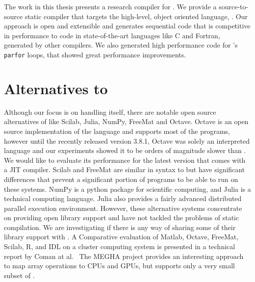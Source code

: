The work in this thesis presents a research compiler for \matlab. 
We provide a source-to-source static
compiler that targets the high-level, object oriented language, \xten.  Our approach is
open and extensible and generates sequential \xten code that is competitive in
performance to code in state-of-the-art languages like C and Fortran, generated
by other \matlab compilers. We also generated high performance code for
\matlab's \texttt{parfor} loops, that showed great performance improvements.

\section{Alternatives to \matlab}
Although our focus is on handling \matlab itself, there are notable open source
alternatives of \matlab like Scilab\cite{Scilab}, Julia\cite{julia},
NumPy\cite{numpy}, FreeMat\cite{freemat} and Octave\cite{Octave}.
Octave is an open source implementation of the \matlab language and supports
most of the \matlab programs, however until the recently released version 3.8.1,
Octave was solely an interpreted language and our experiments showed it to be
orders of magnitude slower than \matlab. We would like to evaluate its
performance for the latest version that comes with a JIT compiler. Scilab and
FreeMat are similar in syntax to \matlab but have significant differences that
prevent a significant portion of \matlab programs to be able to run on these systems.
NumPy is a python package for scientific computing, and Julia is a technical
computing language. Julia also provides a fairly advanced distributed parallel
execution environment. However, these alternative systems concentrate on
providing open library support and have not tackled the problems of static
compilation.  We are investigating if there is any way of
sharing some of their library support with \mixten. A Comparative evaluation of
Matlab, Octave, FreeMat, Scilab, R, and IDL on a cluster computing system is 
presented in a technical report by Coman at al.~\cite{coman}  
The MEGHA
project\cite{megha} provides an interesting approach to map \matlab array
operations to CPUs and GPUs, but supports only a very small subset of \matlab.  


